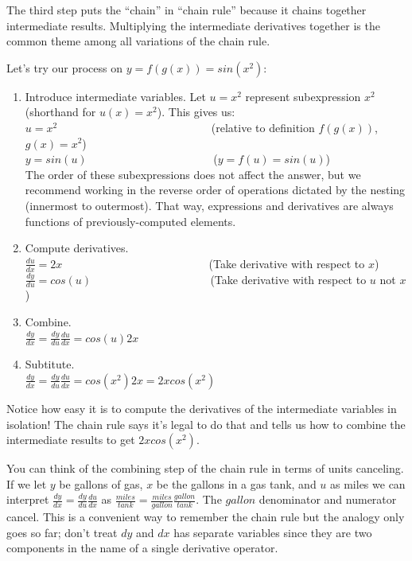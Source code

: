 \documentclass[11pt]{article}
\begin{document}
The third step puts the ``chain'' in ``chain rule'' because it chains together intermediate results. Multiplying the intermediate derivatives together is the common theme among all variations of the chain rule.

Let's try our process on $y = f(g(x)) = sin(x^2)$:

\begin{enumerate}
	\item Introduce intermediate variables. Let $u = x^2$ represent subexpression $x^2$ (shorthand for $u(x) = x^2$). This gives us:\\
	$u = x^2$ ~~~~~~~~~~~~~~~~~~~~~~~~~~~(relative to definition $f(g(x))$, $g(x) = x^2$)\\
	$y = sin(u)$ ~~~~~~~~~~~~~~~~~~~~~~($y = f(u) = sin(u)$)\\
The order of these subexpressions does not affect the answer, but we recommend working in the reverse order of operations dictated by the nesting (innermost to outermost). That way, expressions and derivatives are always functions of previously-computed elements. 
	\item Compute derivatives.\\
	$\frac{du}{dx} = 2x$ ~~~~~~~~~~~~~~~~~~~~~~~~~ (Take derivative with respect to $x$)\\
	$\frac{dy}{du} = cos(u)$  ~~~~~~~~~~~~~~~~~~~~ (Take derivative with respect to $u$ not $x$)
	\item Combine.\\
	$\frac{dy}{dx} = \frac{dy}{du} \frac{du}{dx} = cos(u)2x$
	\item Subtitute.\\
	$\frac{dy}{dx} = \frac{dy}{du} \frac{du}{dx} = cos(x^2)2x = 2xcos(x^2)$	
\end{enumerate}

Notice how easy it is to compute the derivatives of the intermediate variables in isolation! The chain rule says it's legal to do that and tells us how to combine the intermediate results to get $2xcos(x^2)$.

You can think of the combining step of the chain rule in terms of units canceling. If we let $y$ be gallons of gas, $x$ be the gallons in a gas tank, and $u$ as miles we can interpret $\frac{dy}{dx} = \frac{dy}{du} \frac{du}{dx}$ as $\frac{miles}{tank} = \frac{miles}{gallon} \frac{gallon}{tank}$. The $gallon$ denominator and numerator cancel. This is a convenient way to remember the chain rule but the analogy only goes so far; don't treat $dy$ and $dx$ has separate variables since they are two components in the name of a single derivative operator.
\end{document}
